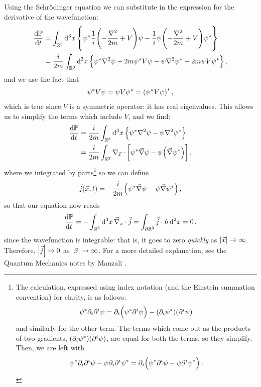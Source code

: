 \documentclass[main.tex]{subfiles}
\begin{document}
Using the Schrödinger equation we can substitute in the expression for the derivative of the wavefunction: 
%
\begin{align}
\dv{\mathbb{P}}{t} &= \int_{\mathbb{R}^3} \dd[3]{x} \qty{
\psi^{*}  \frac{1}{i}\qty(-\frac{\nabla^2}{2m}+V) \psi - \frac{1}{i} \psi \qty(- \frac{\nabla^2}{2m} + V) \psi^{*}   
}  \\
&= \frac{i}{2m} \int_{\mathbb{R}^3} \dd[3]{x} \qty{
\psi^{*} \nabla^2 \psi - 2m \psi^{*} V \psi 
- \psi \nabla^2 \psi^{*}
+ 2m \psi V \psi^{*}
}
\,,
\end{align}
%
and we use the fact that 
%
\begin{align}
\psi^{*} V \psi  = \psi V \psi^{*} = \qty(\psi^{*} V \psi )^{*}
\,,
\end{align}
%
which is true since \(V\) is a symmetric operator: it has real eigenvalues. This allows us to simplify the terms which include \(V\), and we find:
%
\begin{align}
\dv{\mathbb{P}}{t} &= \frac{i}{2m} \int_{\mathbb{R}^3 } \dd[3]{x} \qty{
\psi^{*} \nabla^2 \psi 
- \psi \nabla^2 \psi^{*}  
}  \\
&= \frac{i}{2m} \int_{\mathbb{R}^3} 
\nabla_{\vec{x}} \cdot \qty[
\psi^{*} \vec{\nabla} \psi - \psi\qty(\vec{\nabla} \psi^{*})]
\,,
\end{align}
%
where we integrated by parts\footnote{The calculation, expressed using index notation (and the Einstein summation convention) for clarity, is as follows: 
%
\begin{align}
\psi^{*} \partial_{i} \partial^{i} \psi  = \partial_{i} \qty(\psi^{*} \partial^{i} \psi)  - (\partial_{i} \psi^{*})(\partial^{i} \psi)
\,
\end{align}
%
and similarly for the other term. The terms which come out as the products of two gradients, \(\qty(\partial_{i} \psi^{*}) (\partial^{i} \psi)\), are equal for both the terms, so they simplify. Then, we are left with 
%
\begin{align}
\psi^{*} \partial_{i} \partial^{i} \psi - \psi \partial_{i} \partial^{i} \psi^{*} = \partial_{i} \qty(\psi^{*} \partial^{i} \psi - \psi \partial^{i} \psi^{*})
\,.
\end{align}
%
} so we can define 
%
\begin{align}
\vec{j} (\vec{x}, t) = - \frac{i}{2m} \qty(\psi^{*} \vec{\nabla} \psi - \psi \vec{\nabla} \psi^{*}  )
\,,
\end{align}
%
so that our equation now reads 
%
\begin{align}
\dv{\mathbb{P}}{t} = - \int_{\mathbb{R}^3} \dd[3]{x} \vec{\nabla}_{x} \cdot \vec{j} 
= \int_{\partial \mathbb{R}^3} \vec{j} \cdot \hat{n} \dd[2]{x} = 0
\,,
\end{align}
%
since the wavefunction is integrable: that is, it goes to zero \emph{quickly} as \(\abs{\vec{x}} \rightarrow \infty \). 
Therefore, \(\abs{\vec{j}} \rightarrow 0\) as \(\abs{\vec{x}} \rightarrow \infty \). For a more detailed explanation, see the Quantum Mechanics notes by Manzali \cite[page 147]{manzaliAppuntiDiFisica2019}.
\end{document}
